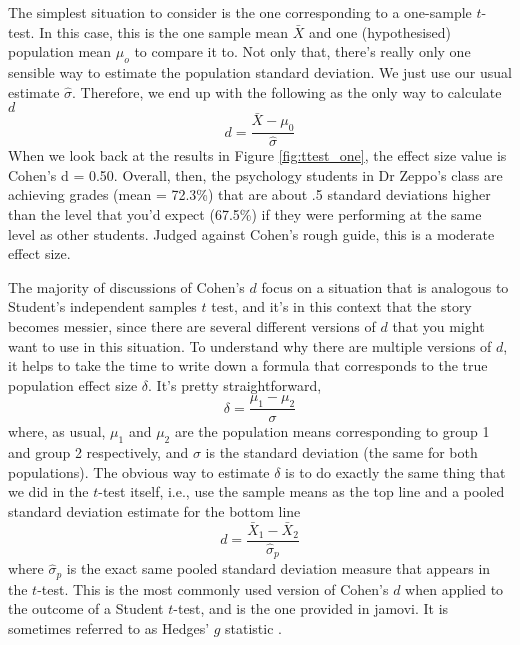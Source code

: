 
The simplest situation to consider is the one corresponding to a one-sample $t$-test. In this case, this is the one sample mean $\bar{X}$ and one (hypothesised) population mean $\mu_o$ to compare it to. Not only that, there's really only one sensible way to estimate the population standard deviation. We just use our usual estimate $\hat{\sigma}$. Therefore, we end up with the following as the only way to calculate $d$
$$
d = \frac{\bar{X} - \mu_0}{\hat{\sigma}}
$$
When we look back at the results in Figure \ref{fig:ttest_one}, the effect size value is Cohen's d = 0.50. Overall, then, the psychology students in Dr Zeppo's class are achieving grades (mean = 72.3\%) that are about .5 standard deviations higher than the level that you'd expect (67.5\%) if they were performing at the same level as other students. Judged against Cohen's rough guide, this is a moderate effect size.



The majority of discussions of Cohen's $d$ focus on a situation that is analogous to Student's independent samples $t$ test, and it's in this context that the story becomes messier, since there are several different versions of $d$ that you might want to use in this situation. To understand why there are multiple versions of $d$, it helps to take the time to write down a formula that corresponds to the true population effect size $\delta$. It's pretty straightforward, 
$$
\delta = \frac{\mu_1 - \mu_2}{\sigma}
$$
where, as usual, $\mu_1$ and $\mu_2$ are the population means corresponding to group 1 and group 2 respectively, and $\sigma$ is the standard deviation (the same for both populations). The obvious way to estimate $\delta$ is to do exactly the same thing that we did in the $t$-test itself, i.e., use the sample means as the top line and a pooled standard deviation estimate for the bottom line
$$
d = \frac{\bar{X}_1 - \bar{X}_2}{\hat{\sigma}_p}
$$
where $\hat\sigma_p$ is the exact same pooled standard deviation measure that appears in the $t$-test. This is the most commonly used version of Cohen's $d$ when applied to the outcome of a Student $t$-test, and is the one provided in jamovi. It is sometimes referred to as Hedges' $g$ statistic \parencite{Hedges1981}. 


